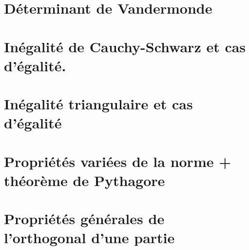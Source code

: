 \documentclass{article}
\begin{document}
\section{Déterminant de Vandermonde}
\section{Inégalité de Cauchy-Schwarz et cas d'égalité.}
\section{Inégalité triangulaire et cas d'égalité}
\section{Propriétés variées de la norme + théorème de Pythagore}
\section{Propriétés générales de l'orthogonal d'une partie}
\end{document}
